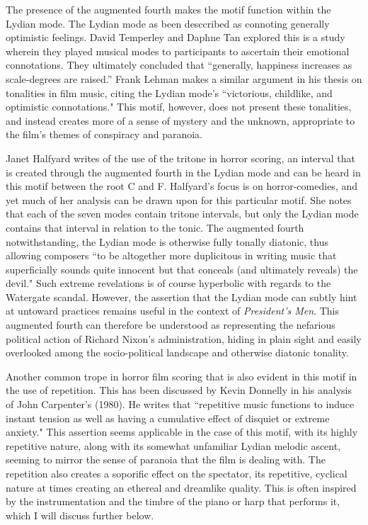 The presence of the augmented fourth makes the motif function within the Lydian mode.
The Lydian mode as been desccribed as connoting generally optimistic feelings.
David Temperley and Daphne Tan explored this is a study wherein they played musical modes to participants to ascertain their emotional connotations.
They ultimately concluded that ``generally, happiness increases as scale-degrees are raised.”\autocites[][255]{temperley_emotional_2013}
Frank Lehman makes a similar argument in his thesis on tonalities in film music, citing the Lydian mode's ``victorious, childlike, and optimistic connotations."\autocites[][31]{lehman_reading_2012}
This motif, however, does not present these tonalities, and instead creates more of a sense of mystery and the unknown, appropriate to the film's themes of conspiracy and paranoia.

Janet Halfyard writes of the use of the tritone in horror scoring, an interval that is created through the augmented fourth in the Lydian mode and can be heard in this motif between the root C and F\sharp.
Halfyard's focus is on horror-comedies, and yet much of her analysis can be drawn upon for this particular motif.
She notes that each of the seven modes contain tritone intervals, but only the Lydian mode contains that interval in relation to the tonic.
The augmented fourth notwithstanding, the Lydian mode is otherwise fully tonally diatonic, thus allowing composers ``to be altogether more duplicitous in writing music that superficially sounds quite innocent but that conceals (and ultimately reveals) the devil."\autocites[][28]{halfyard_mischief_2010}
Such extreme revelations is of course hyperbolic with regards to the Watergate scandal.
However, the assertion that the Lydian mode can subtly hint at untoward practices remains useful in the context of \textit{President's Men}.
This augmented fourth can therefore be understood as representing the nefarious political action of Richard Nixon's administration, hiding in plain sight and easily overlooked among the socio-political landscape and otherwise diatonic tonality.

Another common trope in horror film scoring that is also evident in this motif in the use of repetition.
This has been discussed by Kevin Donnelly in his analysis of John Carpenter's  (1980).
He writes that ``repetitive music functions to induce instant tension as well as having a cumulative effect of disquiet or extreme anxiety."\autocites[][161]{donnelly_hearing_2010}
This assertion seems applicable in the case of this motif, with its highly repetitive nature, along with its somewhat unfamiliar Lydian melodic ascent, seeming to mirror the sense of paranoia that the film is dealing with.
The repetition also creates a soporific effect on the spectator, its repetitive, cyclical nature at times creating an ethereal and dreamlike quality.
This is often inspired by the instrumentation and the timbre of the piano or harp that performs it, which I will discuss further below.



